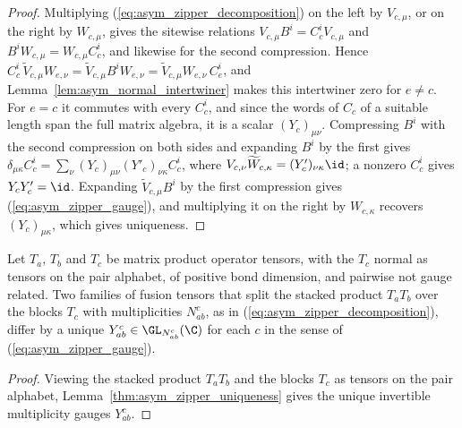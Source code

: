 \begin{proof}
    \leanok
    Multiplying (\ref{eq:asym_zipper_decomposition}) on the left by
    $V_{c,\mu}$, or on the right by $W_{c,\mu}$, gives the sitewise relations
    $V_{c,\mu}B^i=C_c^iV_{c,\mu}$ and $B^iW_{c,\mu}=W_{c,\mu}C_c^i$, and
    likewise for the second compression. Hence
    $C_c^i\,\widetilde V_{c,\mu}W_{e,\nu}=\widetilde V_{c,\mu}B^iW_{e,\nu}
        =\widetilde V_{c,\mu}W_{e,\nu}\,C_e^i$, and
    Lemma~\ref{lem:asym_normal_intertwiner} makes this intertwiner zero for
    $e\neq c$. For $e=c$ it commutes with every $C_c^i$, and since the words
    of $C_c$ of a suitable length span the full matrix algebra, it is a scalar
    $(Y_c)_{\mu\nu}$. Compressing $B^i$ with the second compression on both
    sides and expanding $B^i$ by the first gives
    $\delta_{\mu\kappa}C_c^i=\sum_\nu(Y_c)_{\mu\nu}(Y'_c)_{\nu\kappa}C_c^i$,
    where $V_{c,\nu}\widetilde W_{c,\kappa}=(Y'_c)_{\nu\kappa}\id$; a nonzero
    $C_c^i$ gives $Y_cY'_c=\id$. Expanding $\widetilde V_{c,\mu}B^i$ by the
    first compression gives (\ref{eq:asym_zipper_gauge}), and multiplying it
    on the right by $W_{c,\kappa}$ recovers $(Y_c)_{\mu\kappa}$, which gives
    uniqueness.
\end{proof}

\begin{corollary}
    \label{cor:asym_zipper_fusion_uniqueness}
    \leanok
    Let $T_a$, $T_b$ and $T_c$ be matrix product operator tensors, with the
    $T_c$ normal as tensors on the pair alphabet, of positive bond dimension,
    and pairwise not gauge related. Two families of fusion
    tensors that split the stacked product $T_aT_b$ over the blocks $T_c$
    with multiplicities $N_{ab}^c$, as in
    (\ref{eq:asym_zipper_decomposition}), differ by a unique
    $Y_{ab}^c\in\GL_{N_{ab}^c}(\C)$ for each $c$ in the sense of
    (\ref{eq:asym_zipper_gauge}).
\end{corollary}

\begin{proof}
    \leanok
    Viewing the stacked product $T_aT_b$ and the blocks $T_c$ as tensors on
    the pair alphabet, Lemma~\ref{thm:asym_zipper_uniqueness} gives the
    unique invertible multiplicity gauges $Y_{ab}^c$.
\end{proof}

